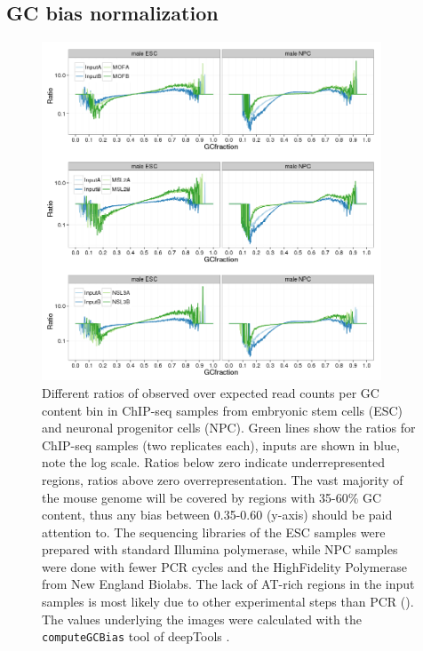 \subsection{GC bias normalization}
\begin{figure}[tb]
\centering
\includegraphics[width=0.9\textwidth]{Figures/ratios_mlES_mlNPC_MOF-NSL3-MSL2.png}
\begin{footnotesize}
\caption[Ratios of observed over expected read counts per GC content bin in ChIP-seq samples from murine embryonic stem cells and neuronal progenitor cells.]{\textsf{Different ratios of observed over expected read counts per GC content bin in ChIP-seq samples from embryonic stem cells (ESC) and neuronal progenitor cells (NPC). Green lines show the ratios for ChIP-seq samples (two replicates each), inputs are shown in blue, note the log scale. Ratios below zero indicate underrepresented regions, ratios above zero overrepresentation. The vast majority of the mouse genome will be covered by regions with 35-60\% GC content, thus any bias between 0.35-0.60 (y-axis) should be paid attention to. The sequencing libraries of the ESC samples were prepared with standard Illumina polymerase, while NPC samples were done with fewer PCR cycles and the HighFidelity Polymerase from New England Biolabs. The lack of AT-rich regions in the input samples is most likely due to other experimental steps than PCR (). The values underlying the images were calculated with the \texttt{computeGCBias} tool of deepTools \citep{Ramirez2014}.
}}
\label{fig:GCbias}
\end{footnotesize}
\end{figure}
